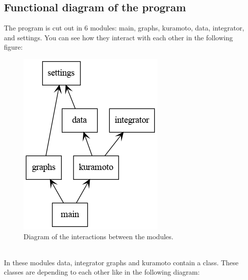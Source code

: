 \documentclass[1pt, a4paper]{article}
\begin{document}
\subsection{Functional diagram of the program}
\label{subs:3.4}
The program is cut out in 6 modules: main, graphs, kuramoto, data, integrator, and settings. You can see how they interact with each other in the following figure:
\begin{figure}[htbp]
    \centering
    \includegraphics[scale=0.45]{figures/packages_kuramotoModel.png}
    \caption{Diagram of the interactions between the modules.}
    \label{fig:diagram_module}
\end{figure}\\
In these modules data, integrator graphs and kuramoto contain a class. These classes are depending to each other like in the following diagram:
\end{document}
